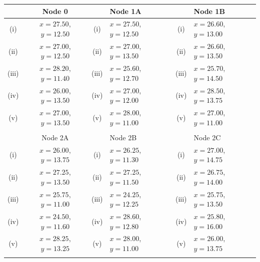 \documentclass[12pt]{article}
\begin{document}
				
				\normalsize	
				\begin{tabular}{||c|c||c|l||c|l||}
					\hline  & Node 0 &   & Node 1A &  & Node 1B     \\  \hline
					\hline (i) & $x= 27.50$, $y= 12.50$ & (i) & $x= 27.50$, $y = 12.50$ &  (i)  & $x= 26.60$, $y= 13.00$\\  \hline
					\hline (ii)  & $x= 27.00$, $y =12.50 $  &  (ii) & $x= 27.00$, $y = 13.50$ & (ii) & $x= 26.60$, $y = 13.50 $ \\  \hline
					\hline (iii) & $x= 28.20$, $y = 11.40$  & (iii) & $x= 25.60$, $y = 12.70 $ & (iii) & $x= 25.70$, $y = 14.50$ \\  \hline
					\hline (iv)  & $x= 26.00$, $y = 13.50$  &  (iv) & $x= 27.00$, $y = 12.00$  & (iv)  & $x= 28.50$, $y= 13.75$\\  \hline
					\hline (v) & $x= 27.00$, $y = 13.50$ & (v)  & $x= 28.00$, $y= 11.00$ & (v) & $x= 27.00$, $y = 11.00$\\  \hline & & & & & \\
					\hline 
		
					\hline  & Node 2A &   & Node 2B &  & Node 2C  \\  \hline
					\hline (i) & $x= 26.00$, $y= 13.75$ & (i)  & $x= 26.25 $, $y = 11.30 $  & (i)  & $x= 27.00$, $y = 14.75$\\  \hline
					\hline (ii)  & $x= 27.25$, $y = 13.50$  &  (ii) &$x= 27.25$, $y = 11.50$ & (ii) & $x= 26.75$, $y = 14.00 $ \\  \hline
					\hline (iii) & $x= 25.75  $, $y = 11.00 $  &  (iii) &$x= 24.25 $, $y = 12.25 $ &  (iii) & $x= 25.75$, $y = 13.50$ \\  \hline
					\hline (iv)  & $x= 24.50$, $y = 11.60 $  & (iv) & $x= 28.60 $, $y = 12.80 $ & (iv)  & $x= 25.80$, $y = 16.00$\\  \hline
					\hline (v) & $x= 28.25 $, $y = 13.25 $ & (v) & $x= 28.00$, $y= 11.00$  &(v) & $x= 26.00$, $y = 13.75$\\  \hline & & & & & \\
					\hline 
							\end{tabular} 
									\newpage	
\end{document}
